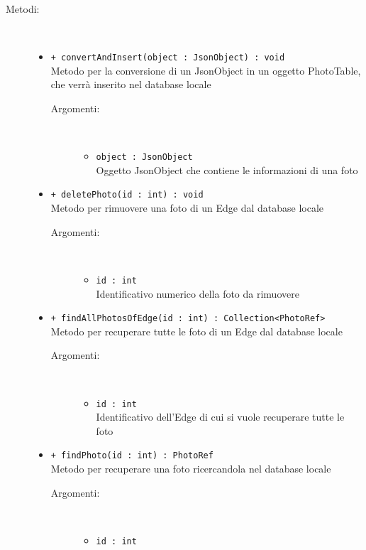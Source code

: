 \documentclass[../DefinizioneDiProdotto.tex]{subfiles}
\begin{document}
\begin{description}
\begin{itemize}
\end{itemize}
\item[Metodi:] \
\begin{itemize}
\item \texttt{+ convertAndInsert(object : JsonObject) : void}\\
Metodo per la conversione di un JsonObject in un oggetto PhotoTable, che verrà inserito nel database locale
 \begin{description}
\item[Argomenti:] \
\begin{itemize}
\item \texttt{object : JsonObject}\\
Oggetto JsonObject che contiene le informazioni di una foto\end{itemize}
\end{description}
\item \texttt{+ deletePhoto(id : int) : void}\\
Metodo per rimuovere una foto di un Edge dal database locale
 \begin{description}
\item[Argomenti:] \
\begin{itemize}
\item \texttt{id : int}\\
Identificativo numerico della foto da rimuovere\end{itemize}
\end{description}
\item \texttt{+ findAllPhotosOfEdge(id : int) : Collection<PhotoRef>}\\
Metodo per recuperare tutte le foto di un Edge dal database locale
 \begin{description}
\item[Argomenti:] \
\begin{itemize}
\item \texttt{id : int}\\
Identificativo dell'Edge di cui si vuole recuperare tutte le foto\end{itemize}
\end{description}
\item \texttt{+ findPhoto(id : int) : PhotoRef}\\
Metodo per recuperare una foto ricercandola nel database locale
 \begin{description}
\item[Argomenti:] \
\begin{itemize}
\item \texttt{id : int}\\

\end{itemize}
\end{description}
\end{itemize}
\end{description}
\end{document}
